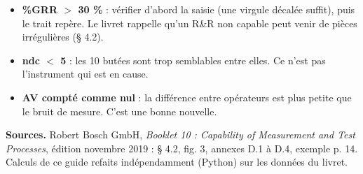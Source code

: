 \documentclass[10pt,a4paper]{article}
\begin{document}
\begin{itemize}
\item \textbf{\%GRR $>$ 30 \%} : vérifier d'abord la saisie (une virgule décalée suffit), puis le trait repère. Le livret rappelle qu'un R\&R non capable peut venir de pièces irrégulières (§ 4.2).
\item \textbf{ndc $<$ 5} : les 10 butées sont trop semblables entre elles. Ce n'est pas l'instrument qui est en cause.
\item \textbf{AV compté comme nul} : la différence entre opérateurs est plus petite que le bruit de mesure. C'est une bonne nouvelle.
\end{itemize}

\vfill
{\footnotesize\color{uimm}\textbf{Sources.} Robert Bosch GmbH, \emph{Booklet 10 : Capability of Measurement and Test Processes}, édition novembre 2019 : § 4.2, fig. 3, annexes D.1 à D.4, exemple p. 14. Calculs de ce guide refaits indépendamment (Python) sur les données du livret.}
\end{document}
